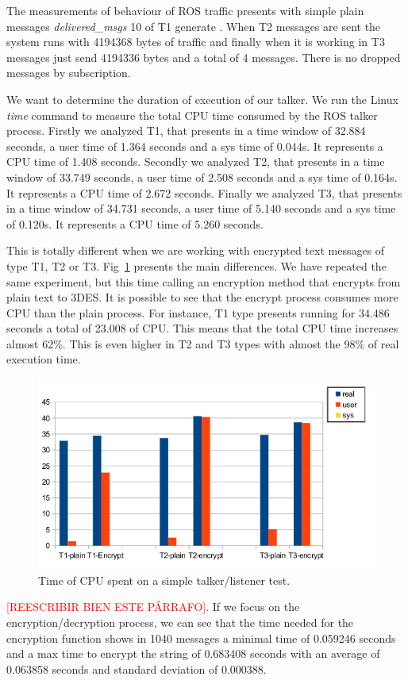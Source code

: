 \documentclass[journal,twoside]{JoPhA}
\begin{document}
The measurements of behaviour of ROS traffic presents with simple plain messages {\em delivered\_msgs} 10 of T1 generate . When T2 messages are sent the system runs with 4194368 bytes of traffic and finally when it is working in  T3 messages just send 4194336 bytes and a total of 4 messages. There is no dropped messages by subscription.

We want to determine the duration of execution of our talker. We run the Linux {\em time} command to measure the total CPU time consumed by the ROS talker process. 
Firstly we analyzed T1, that presents in a time window of 32.884 seconds, a user time of  1.364 seconds and a sys time of 0.044s. It represents a CPU time of 1.408 seconds.
Secondly we analyzed T2, that presents in a time window of 33.749 seconds, a user time of  2.508 seconds and a sys time of 0.164s. It represents a CPU time of 2.672 seconds.
Finally we analyzed T3, that presents in a time window of 34.731 seconds, a user time of  5.140 seconds and a sys time of 0.120s. It represents a CPU time of 5.260 seconds.

This is totally different when we are working with encrypted text messages of type T1, T2 or T3. Fig~\ref{fig:time_text_CPU} presents the main differences. We have repeated the same experiment, but this time calling an encryption method that encrypts from plain text to 3DES. It is possible to see that the encrypt process consumes more CPU than  the plain process.
For instance, T1 type presents running for 34.486 seconds a total of 23.008 of CPU. This means that the total CPU time increases almost 62\%. This is even higher in T2 and T3 types with almost the 98\% of real execution time.
\begin{figure}[ht!]
    \centering
    \includegraphics[width=.5\textwidth]{Tiempos_CPU_cifrado_texto.png}
    \caption{Time of CPU spent on a simple talker/listener test.}
  \label{fig:time_text_CPU}
\end{figure}

\textcolor{red}{[REESCRIBIR BIEN ESTE P\'ARRAFO].} If we focus on the encryption/decryption process, we can see that the time needed for the encryption function shows in 1040 messages a minimal time of 0.059246 seconds and a max time to encrypt the string of 0.683408 seconds with an average of 0.063858 seconds and standard deviation of 0.000388.
\end{document}
